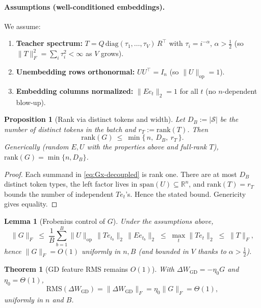 \documentclass[11pt]{article}
\newtheorem{theorem}{Theorem}
\newtheorem{lemma}{Lemma}
\newtheorem{proposition}{Proposition}
\theoremstyle{definition}
\newcommand{\op}{\mathrm{op}}
\begin{document}
\paragraph{Assumptions (well-conditioned embeddings).}
We assume:
\begin{enumerate}[left=1.3em, itemsep=2pt, topsep=2pt]
\item \textbf{Teacher spectrum:} $T=Q\,\mathrm{diag}(\tau_1,\dots,\tau_V)\,R^\top$ with $\tau_i=i^{-\alpha}$, $\alpha>\tfrac12$ (so $\|T\|_F^2=\sum_i \tau_i^2<\infty$ as $V$ grows).
\item \textbf{Unembedding rows orthonormal:} $U U^\top = I_n$ (so $\|U\|_{\op}=1$).
\item \textbf{Embedding columns normalized:} $\|E e_t\|_2=1$ for all $t$ (no $n$-dependent blow-up).
\end{enumerate}

\begin{proposition}[Rank via distinct tokens and width]\label{prop:rankToy-decoupled}
Let $D_B:=|\mathcal{S}|$ be the number of distinct tokens in the batch and $r_T:=\mathrm{rank}(T)$. Then
\[
\mathrm{rank}(G)\ \le\ \min\{\,n,\ D_B,\ r_T\,\}.
\]
Generically (random $E,U$ with the properties above and full-rank $T$), $\mathrm{rank}(G)=\min\{n,D_B\}$.
\end{proposition}

\begin{proof}
Each summand in \eqref{eq:Gx-decoupled} is rank one. There are at most $D_B$ distinct token types, the left factor lives in $\mathrm{span}(U)\subseteq\mathbb{R}^n$, and $\mathrm{rank}(T)=r_T$ bounds the number of independent $T e_t$’s. Hence the stated bound. Genericity gives equality.
\end{proof}

\begin{lemma}[Frobenius control of $G$]\label{lem:GFbound-decoupled}
Under the assumptions above,
\[
\|G\|_F \;\le\; \frac1B \sum_{b=1}^B \|U\|_{\op}\,\|T e_{t_b}\|_2\,\|E e_{t_b}\|_2
\;\le\; \max_{t}\|T e_t\|_2
\;\le\; \|T\|_F,
\]
hence $\|G\|_F = O(1)$ uniformly in $n,B$ (and bounded in $V$ thanks to $\alpha>\tfrac12$).
\end{lemma}

\begin{theorem}[GD feature RMS remains $O(1)$]\label{thm:GD-decoupled}
With $\Delta W_{\mathrm{GD}}=-\eta_0 G$ and $\eta_0=\Theta(1)$,
\[
\mathrm{RMS}(\Delta W_{\mathrm{GD}})=\|\Delta W_{\mathrm{GD}}\|_F=\eta_0\|G\|_F=\Theta(1),
\]
uniformly in $n$ and $B$.
\end{theorem}
\end{document}
